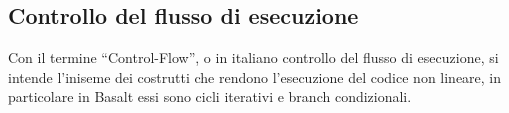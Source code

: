 \subsection{Controllo del flusso di esecuzione}
Con il termine “Control-Flow”, o in italiano controllo del flusso di esecuzione, si intende l’iniseme dei costrutti che rendono 
l’esecuzione del codice non lineare, in particolare in Basalt essi sono cicli iterativi e branch condizionali. 

 \newpage
 \newpage
 \newpage
 \newpage